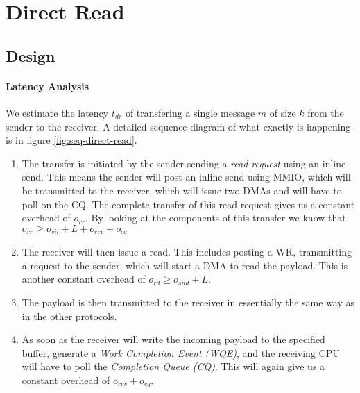 
\section{Direct Read}
\subsection{Design}

\paragraph{Latency Analysis}

We estimate the latency $t_{dr}$ of transfering a single message $m$ of size $k$ from the sender to the receiver. 
A detailed sequence diagram of what exactly is happening is in figure \ref{fig:seq-direct-read}. 

\begin{enumerate}
  \item The transfer is initiated by the sender sending a \emph{read request} using an inline send. This means the sender
    will post an inline send using MMIO, which will be transmitted to the receiver, which will issue two DMAs and will have
    to poll on the CQ. The complete transfer of this read request gives us a constant overhead of $o_{rr}$. By looking at the
    components of this transfer we know that $o_{rr} \geq o_{sil} + L + o_{rcv} + o_{cq}$
  \item The receiver will then issue a read. This includes posting a WR, transmitting a request to the sender, which will start
    a DMA to read the payload. This is another constant overhead of $o_{rd} \geq o_{snd} + L$.
  \item The payload is then transmitted to the receiver in essentially the same way as in the other protocols.
  \item As soon as the receiver will write the incoming payload to the specified buffer, generate a 
    \emph{Work Completion Event (WQE)}, and the receiving CPU will have to poll the \emph{Completion Queue (CQ)}. 
    This will again give us a constant overhead of $o_{rcv} + o_{cq}$. 
\end{enumerate}



